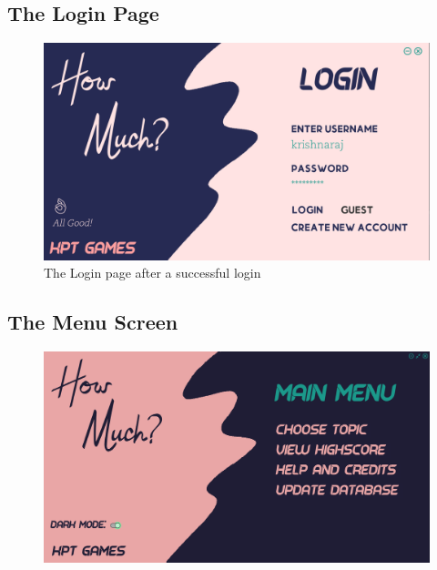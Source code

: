 \documentclass[11pt]{article}
\begin{document}
\subsection{The Login Page}
\begin{figure}[H]
	\centering
	\includegraphics[scale=0.45]{./design/Screenshots/Login Screen.png}
	\caption{The Login page after a successful login}
\end{figure}
\subsection{The Menu Screen}
\begin{figure}[H]
	\centering
	\includegraphics[scale=0.30]{./design/Screenshots/Main Menu Screen.png}
	\caption{}
\end{figure}
\end{document}
